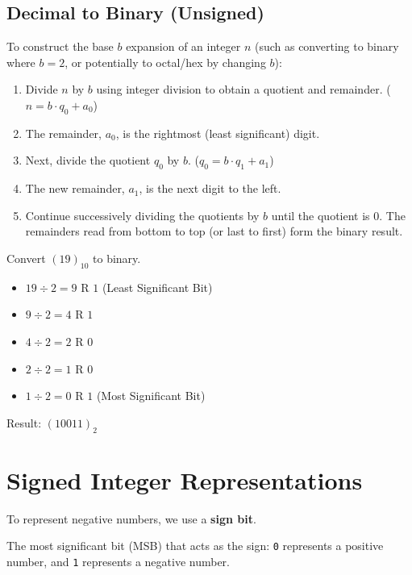 \subsection{Decimal to Binary (Unsigned)}

To construct the base $b$ expansion of an integer $n$ (such as converting to binary where $b=2$, or potentially to octal/hex by changing $b$):

\begin{enumerate}
    \item Divide $n$ by $b$ using integer division to obtain a quotient and remainder. ($n = b \cdot q_0 + a_0$)
    \item The remainder, $a_0$, is the rightmost (least significant) digit.
    \item Next, divide the quotient $q_0$ by $b$. ($q_0 = b \cdot q_1 + a_1$)
    \item The new remainder, $a_1$, is the next digit to the left.
    \item Continue successively dividing the quotients by $b$ until the quotient is 0. The remainders read from bottom to top (or last to first) form the binary result.
\end{enumerate}

\begin{example}
Convert $(19)_{10}$ to binary.

\begin{itemize}
    \item $19 \div 2 = 9$ R $1$ (Least Significant Bit)
    \item $9 \div 2 = 4$ R $1$
    \item $4 \div 2 = 2$ R $0$
    \item $2 \div 2 = 1$ R $0$
    \item $1 \div 2 = 0$ R $1$ (Most Significant Bit)
\end{itemize}

Result: $(10011)_2$
\end{example}

\section{Signed Integer Representations}

To represent negative numbers, we use a \textbf{sign bit}.

\vspace{10pt}
\begin{vocabulary}
The most significant bit (MSB) that acts as the sign: \texttt{0} represents a positive number, and \texttt{1} represents a negative number.
\end{vocabulary}

